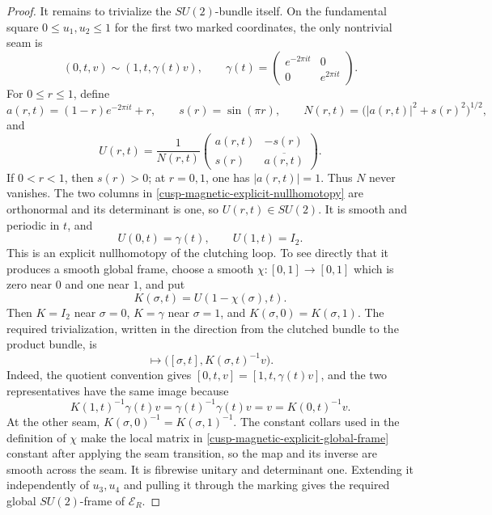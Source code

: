 \begin{proof}
It remains to trivialize the \(SU(2)\)-bundle itself.  On the fundamental
square \(0\le u_1,u_2\le1\) for the first two marked coordinates, the only
nontrivial seam is
\[
 (0,t,v)\sim(1,t,\gamma(t)v),
 \qquad
 \gamma(t)=
 \begin{pmatrix}e^{-2\pi it}&0\\0&e^{2\pi it}\end{pmatrix}.
\]
For \(0\le r\le1\), define
\[
 a(r,t)=(1-r)e^{-2\pi it}+r,
 \qquad
 s(r)=\sin(\pi r),
 \qquad
 N(r,t)=\bigl(|a(r,t)|^2+s(r)^2\bigr)^{1/2},
\]
and
\begin{equation}
 U(r,t)=\frac1{N(r,t)}
 \begin{pmatrix}
  a(r,t)&-s(r)\\
  s(r)&\overline{a(r,t)}
 \end{pmatrix}.
 \label{cusp-magnetic-explicit-nullhomotopy}
\end{equation}
If \(0<r<1\), then \(s(r)>0\); at \(r=0,1\), one has
\(|a(r,t)|=1\).  Thus \(N\) never vanishes.  The two columns in
\eqref{cusp-magnetic-explicit-nullhomotopy} are orthonormal and its
determinant is one, so \(U(r,t)\in SU(2)\).  It is smooth and periodic in
\(t\), and
\[
 U(0,t)=\gamma(t),
 \qquad
 U(1,t)=I_2.
\]
This is an explicit nullhomotopy of the clutching loop.  To see directly
that it produces a smooth global frame, choose a smooth
\(\chi:[0,1]\to[0,1]\) which is zero near \(0\) and one near \(1\), and put
\[
 K(\sigma,t)=U(1-\chi(\sigma),t).
\]
Then \(K=I_2\) near \(\sigma=0\), \(K=\gamma\) near \(\sigma=1\), and
\(K(\sigma,0)=K(\sigma,1)\).  The required trivialization, written in the
direction from the clutched bundle to the product bundle, is
\begin{equation}
 [\sigma,t,v]\longmapsto
 \bigl([\sigma,t],K(\sigma,t)^{-1}v\bigr).
 \label{cusp-magnetic-explicit-global-frame}
\end{equation}
Indeed, the quotient convention gives
\([0,t,v]=[1,t,\gamma(t)v]\), and the two representatives have the same
image because
\[
 K(1,t)^{-1}\gamma(t)v
 =\gamma(t)^{-1}\gamma(t)v
 =v=K(0,t)^{-1}v.
\]
At the other seam,
\(K(\sigma,0)^{-1}=K(\sigma,1)^{-1}\).  The constant collars used in the
definition of \(\chi\) make the local matrix in
\cref{cusp-magnetic-explicit-global-frame} constant after applying the
seam transition, so the map and its inverse are smooth across the seam.
It is fibrewise unitary and determinant one.  Extending it independently
of \(u_3,u_4\) and
pulling it through the marking gives the required global
\(SU(2)\)-frame of \(\mathscr E_R\).
\end{proof}

